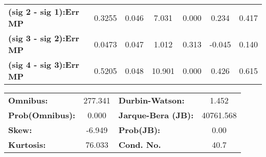 \begin{center}
\begin{tabular}{lcccccc}
\textbf{(sig 2 - sig 1):Err MP} &       0.3255  &        0.046     &     7.031  &         0.000        &        0.234    &        0.417     \\
\textbf{(sig 3 - sig 2):Err MP} &       0.0473  &        0.047     &     1.012  &         0.313        &       -0.045    &        0.140     \\
\textbf{(sig 4 - sig 3):Err MP} &       0.5205  &        0.048     &    10.901  &         0.000        &        0.426    &        0.615     \\
\bottomrule
\end{tabular}
\end{center}\begin{center}
\begin{tabular}{lclc}
\toprule
\textbf{Omnibus:}       & 277.341 & \textbf{  Durbin-Watson:     } &     1.452  \\
\textbf{Prob(Omnibus):} &   0.000 & \textbf{  Jarque-Bera (JB):  } & 40761.568  \\
\textbf{Skew:}          &  -6.949 & \textbf{  Prob(JB):          } &      0.00  \\
\textbf{Kurtosis:}      &  76.033 & \textbf{  Cond. No.          } &      40.7  \\
\bottomrule
\end{tabular}
\end{center}